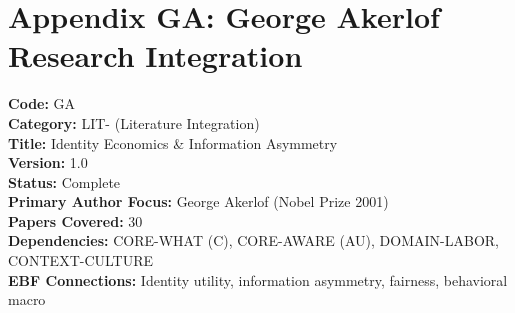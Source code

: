 
\chapter*{Appendix GA: George Akerlof Research Integration}
\label{app:akerlof}

\begin{tcolorbox}[colback=blue!5!white, colframe=blue!75!black, title=Appendix Metadata]
\textbf{Code:} GA \\
\textbf{Category:} LIT- (Literature Integration) \\
\textbf{Title:} Identity Economics \& Information Asymmetry \\
\textbf{Version:} 1.0 \\
\textbf{Status:} Complete \\
\textbf{Primary Author Focus:} George Akerlof (Nobel Prize 2001) \\
\textbf{Papers Covered:} 30 \\
\textbf{Dependencies:} CORE-WHAT (C), CORE-AWARE (AU), DOMAIN-LABOR, CONTEXT-CULTURE \\
\textbf{EBF Connections:} Identity utility, information asymmetry, fairness, behavioral macro
\end{tcolorbox}

